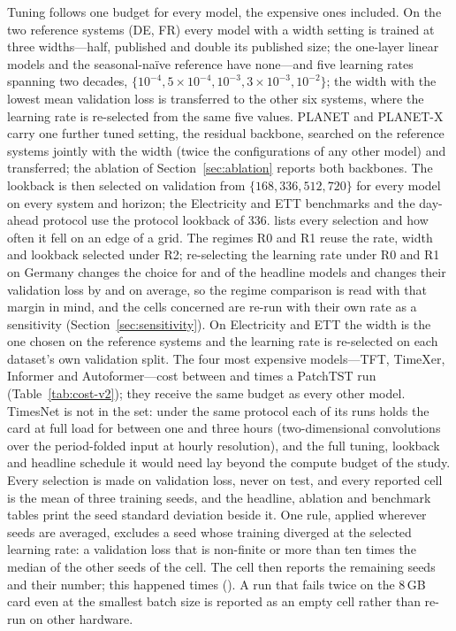 Tuning follows one budget for every model, the expensive ones included. On the two reference
systems (DE, FR) every model with a width setting is trained at three widths---half,
published and double its published size; the one-layer linear models and the
seasonal-na\"ive reference have none---and five learning rates spanning two decades,
$\{10^{-4},5\!\times\!10^{-4},10^{-3},3\!\times\!10^{-3},10^{-2}\}$; the width with the
lowest mean validation loss is transferred to the other six systems, where the learning rate
is re-selected from the same five values. PLANET and PLANET-X carry one further tuned
setting, the residual backbone, searched on the reference systems jointly with the width
(twice the configurations of any other model) and transferred; the ablation of
Section~\ref{sec:ablation} reports both backbones. The lookback is then selected on validation
from $\{168,336,512,720\}$ for every model on every system and horizon; the Electricity and ETT
benchmarks and the day-ahead protocol use the protocol lookback of 336. 
lists every selection and how often it fell on an edge of a grid. The regimes R0 and R1 reuse
the rate, width and lookback selected under R2; re-selecting the learning rate under R0 and R1
on Germany changes the choice for  and  of the
 headline models and changes their validation loss by
 and  on average, so the regime
comparison is read with that margin in mind, and the cells concerned are re-run with their own
rate as a sensitivity (Section~\ref{sec:sensitivity}). On Electricity and ETT the width is the one chosen
on the reference systems and the learning rate is re-selected on each dataset's own validation
split. The four most expensive models---TFT, TimeXer,
Informer and Autoformer---cost between  and
 times a PatchTST run (Table~\ref{tab:cost-v2}); they receive
the same budget as every other model. TimesNet \cite{wu2023timesnet} is not in the set: under
the same protocol each of its runs holds the card at full load for between one and three hours
(two-dimensional convolutions over the period-folded input at hourly resolution), and the full
tuning, lookback and headline schedule it would need lay beyond the compute budget of the
study. Every selection is made on validation loss, never on
test, and every reported cell is the mean of three training seeds, and the headline, ablation and
benchmark tables print the seed standard deviation beside it. One rule, applied wherever seeds are
averaged, excludes a seed whose training diverged at the selected learning rate: a validation
loss that is non-finite or more than ten times the median of the other seeds of the cell. The
cell then reports the remaining seeds and their number; this happened 
times (). A run that fails twice on the 8\,GB card even at the smallest
batch size is reported as an empty cell rather than re-run on other hardware.


